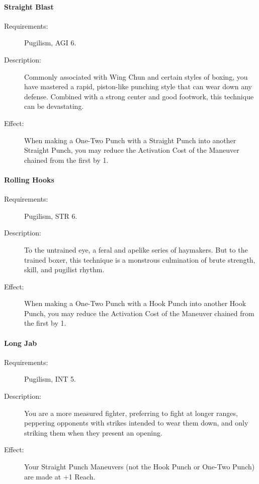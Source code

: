 \documentclass[oneside,11pt,english]{book}
\begin{document}
\paragraph{\label{talent:Straight Blast}Straight Blast}
\begin{description}
	\item [Requirements:] Pugilism, AGI 6. 
	\item [Description:] Commonly associated with Wing Chun and certain styles of boxing, you have mastered a rapid, piston-like punching style that can wear down any defense. Combined with a strong center and 
	good footwork, this technique can be devastating. 
	\item [Effect:] When making a One-Two Punch with a Straight Punch into another Straight Punch, you may reduce the Activation Cost of the Maneuver chained from the first by 1. 
	
\end{description}
\paragraph{\label{talent:Rolling Hooks}Rolling Hooks}
\begin{description}
	\item [Requirements:] Pugilism, STR 6. 
	\item [Description:] To the untrained eye, a feral and apelike series of haymakers. But to the trained boxer, this technique is a monstrous culmination of brute strength, skill, and pugilist rhythm. 
	\item [Effect:] When making a One-Two Punch with a Hook Punch into another Hook Punch, you may reduce the Activation Cost of the Maneuver chained from the first by 1. 
	
\end{description}
\paragraph{\label{talent:Long Jab}Long Jab}
\begin{description}
	\item [Requirements:] Pugilism, INT 5. 
	\item [Description:] You are a more measured fighter, preferring to fight at longer ranges, peppering opponents with strikes intended to wear them down, and only striking them when they present an opening. 
	\item [Effect:] Your Straight Punch Maneuvers (not the Hook Punch or One-Two Punch) are made at +1 Reach.
	
\end{description}
\end{document}
